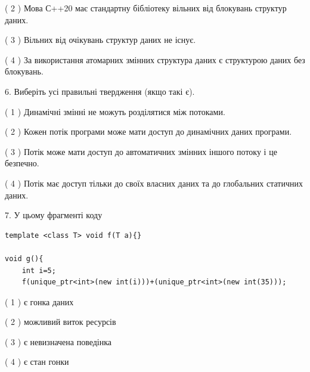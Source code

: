 \documentclass[12pt, ukrainian]{article}
\begin{document}
\begin {large}
{( 2 ) Мова С++20 має стандартну бібліотеку вільних від блокувань структур даних.%

( 3 ) Вільних від очікувань структур даних не існує.%

( 4 ) За використання атомарних змінних структура даних є структурою даних без блокувань.%
\newpage



\vspace{5mm}
6. Виберіть усі правильні твердження (якщо такі є).\par
\vspace{2mm}

( 1 ) Динамічні змінні не можуть розділятися між потоками.%

( 2 ) Кожен потік програми може мати доступ до динамічних даних програми.%

( 3 ) Потік може мати доступ до автоматичних змінних іншого потоку і це безпечно.%

( 4 ) Потік має доступ тільки до своїх власних даних та до глобальних статичних даних.%


\vspace{5mm}
7. У цьому фрагменті коду
\begin{verbatim}
template <class T> void f(T a){}

void g(){
    int i=5;
    f(unique_ptr<int>(new int(i)))+(unique_ptr<int>(new int(35)));
\end{verbatim}
( 1 ) є гонка даних%

( 2 ) можливий виток ресурсів%

( 3 ) є невизначена поведінка%

( 4 ) є стан гонки%
}
\end {large}
\end{document}
